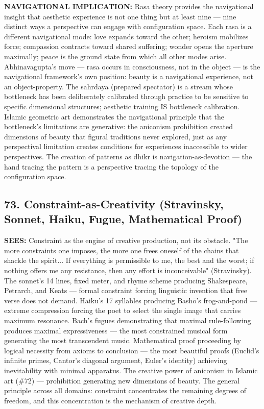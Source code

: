 \textbf{NAVIGATIONAL IMPLICATION:} Rasa theory provides the navigational insight that aesthetic experience is not one thing but at least nine — nine distinct ways a perspective can engage with configuration space. Each rasa is a different navigational mode: love expands toward the other; heroism mobilizes force; compassion contracts toward shared suffering; wonder opens the aperture maximally; peace is the ground state from which all other modes arise. Abhinavagupta's move — rasa occurs in consciousness, not in the object — is the navigational framework's own position: beauty is a navigational experience, not an object-property. The sahrdaya (prepared spectator) is a stream whose bottleneck has been deliberately calibrated through practice to be sensitive to specific dimensional structures; aesthetic training IS bottleneck calibration. Islamic geometric art demonstrates the navigational principle that the bottleneck's limitations are generative: the aniconism prohibition created dimensions of beauty that figural traditions never explored, just as any perspectival limitation creates conditions for experiences inaccessible to wider perspectives. The creation of patterns as dhikr is navigation-as-devotion — the hand tracing the pattern is a perspective tracing the topology of the configuration space.


\bigskip\noindent\makebox[\textwidth]{\color{rulegray}\rule{5cm}{0.3pt}}\bigskip


\subsection*{73. Constraint-as-Creativity (Stravinsky, Sonnet, Haiku, Fugue, Mathematical Proof)}


\textbf{SEES:} Constraint as the engine of creative production, not its obstacle. "The more constraints one imposes, the more one frees oneself of the chains that shackle the spirit... If everything is permissible to me, the best and the worst; if nothing offers me any resistance, then any effort is inconceivable" (Stravinsky). The sonnet's 14 lines, fixed meter, and rhyme scheme producing Shakespeare, Petrarch, and Keats — formal constraint forcing linguistic invention that free verse does not demand. Haiku's 17 syllables producing Bashō's frog-and-pond — extreme compression forcing the poet to select the single image that carries maximum resonance. Bach's fugues demonstrating that maximal rule-following produces maximal expressiveness — the most constrained musical form generating the most transcendent music. Mathematical proof proceeding by logical necessity from axioms to conclusion — the most beautiful proofs (Euclid's infinite primes, Cantor's diagonal argument, Euler's identity) achieving inevitability with minimal apparatus. The creative power of aniconism in Islamic art (\#72) — prohibition generating new dimensions of beauty. The general principle across all domains: constraint concentrates the remaining degrees of freedom, and this concentration is the mechanism of creative depth.


